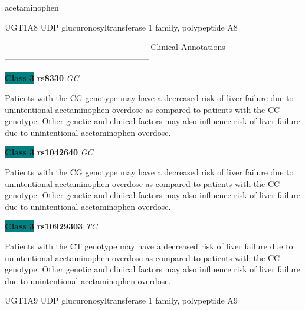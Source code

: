 \documentclass{resume} %
\begin{document}
\begin{rSection}{ acetaminophen }
\begin{rSubsection}{ UGT1A8 }{ UDP glucuronosyltransferase 1 family, polypeptide A8 }{}{}
\item[] ---------------------------------------------------- Clinical Annotations -----------------------------------------------------\newline
\item \textbf{\colorbox{teal} {Class 3}} \textbf{ rs8330 } \textit{ GC }
\item[] Patients with the CG genotype may have a decreased risk of liver failure due to unintentional acetaminophen overdose as compared to patients with the CC genotype. Other genetic and clinical factors may also influence risk of liver failure due to unintentional acetaminophen overdose.\item \textbf{\colorbox{teal} {Class 3}} \textbf{ rs1042640 } \textit{ GC }
\item[] Patients with the CG genotype may have a decreased risk of liver failure due to unintentional acetaminophen overdose as compared to patients with the CC genotype. Other genetic and clinical factors may also influence risk of liver failure due to unintentional acetaminophen overdose.\item \textbf{\colorbox{teal} {Class 3}} \textbf{ rs10929303 } \textit{ TC }
\item[] Patients with the CT genotype may have a decreased risk of liver failure due to unintentional acetaminophen overdose as compared to patients with the CC genotype. Other genetic and clinical factors may also influence risk of liver failure due to unintentional acetaminophen overdose.
\end{rSubsection}\begin{rSubsection}{ UGT1A9 }{ UDP glucuronosyltransferase 1 family, polypeptide A9 }{}{}
\item[]


\end{rSubsection}
\end{rSection}
\end{document}
